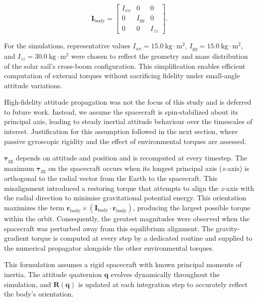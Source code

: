 \documentclass[final,3p,times,twocolumn]{elsarticle}
\begin{document}
\begin{equation}
\mathbf{I}_{\text{body}} = 
\begin{bmatrix}
I_{xx} & 0 & 0 \\
0 & I_{yy} & 0 \\
0 & 0 & I_{zz}
\end{bmatrix}.
\end{equation}

\noindent For the simulations, representative values \( I_{xx} = 15.0~\text{kg}\cdot\text{m}^2 \), \( I_{yy} = 15.0~\text{kg}\cdot\text{m}^2 \), and \( I_{zz} = 30.0~\text{kg}\cdot\text{m}^2 \) were chosen to reflect the geometry and mass distribution of the solar sail's cross-boom configuration. This simplification enables efficient computation of external torques without sacrificing fidelity under small-angle attitude variations.

\vspace{2pt}
\par\noindent High-fidelity attitude propagation was not the focus of this study and is deferred to future work. Instead, we assume the spacecraft is spin-stabilized about its principal axis, leading to steady inertial attitude behaviour over the timescales of interest. Justification for this assumption followed in the next section, where passive gyroscopic rigidity and the effect of environmental torques are assessed.

\vspace{5pt}
\par\noindent $\boldsymbol{\tau}_{\text{gg}}$ depends on attitude and position and is recomputed at every timestep. The maximum $\boldsymbol{\tau}_{\text{gg}}$ on the spacecraft occurs when its longest principal axis ($z$-axis) is orthogonal to the radial vector from the Earth to the spacecraft. This misalignment introduced a restoring torque that attempts to align the $z$-axis with the radial direction to minimise gravitational potential energy. This orientation maximizes the term $\mathbf{r}_{\text{body}} \times (\mathbf{I}_{\text{body}} \cdot \mathbf{r}_{\text{body}})$, producing the largest possible torque within the orbit. Consequently, the greatest magnitudes were observed when the spacecraft was perturbed away from this equilibrium alignment. The gravity-gradient torque is computed at every step by a dedicated routine and supplied to the numerical propagator alongside the other environmental torques.\vspace{5pt}


\par\noindent This formulation assumes a rigid spacecraft with known principal moments of inertia. The attitude quaternion \( \mathbf{q} \) evolves dynamically throughout the simulation, and \( \mathbf{R}(\mathbf{q}) \) is updated at each integration step to accurately reflect the body's orientation.
\end{document}
